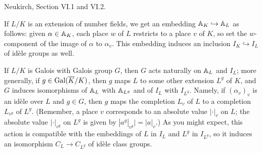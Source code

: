 %
%
%
%
%
%
%

Neukirch, Section VI.1 and VI.2.


If $L/K$ is an extension of number fields, we get an embedding
$\AA_K \hookrightarrow \AA_L$ as follows: given $\alpha \in \AA_K$,
each place $w$ of $L$ restricts to a place $v$ of $K$, so set the $w$-component
of the image of $\alpha$ to $\alpha_v$.
This embedding induces an inclusion $I_K \hookrightarrow I_L$ of id\`ele groups
as well.

If $L/K$ is Galois with Galois group $G$, then $G$ acts naturally on
$\AA_L$ and $I_L$; more generally, if $g \in \Gal(\overline{K}/K)$, then
$g$ maps $L$ to some other extension $L^g$ of $K$, and $G$ induces
isomorphisms of $\AA_L$ with $\AA_{L^g}$ and
of $I_L$ with $I_{L^g}$. Namely, if $(\alpha_v)_v$ is an
id\`ele over $L$ and $g \in G$, then $g$ maps the completion $L_v$
of $L$ to a completion $L_{v^g}$ of $L^g$. (Remember, a place $v$
corresponds to an absolute value $|\cdot|_v$ on $L$; the absolute
value $|\cdot|_{v^g}$ on $L^g$ is given by $|a^g|_{v^g}| = |a|_v$.)
As you might expect, this action is compatible with the embeddings
of $L$ in $I_L$ and $L^g$ in $I_{L^g}$, so it induces an isomorphism
$C_L \to C_{L^g}$ of id\`ele class groups.

